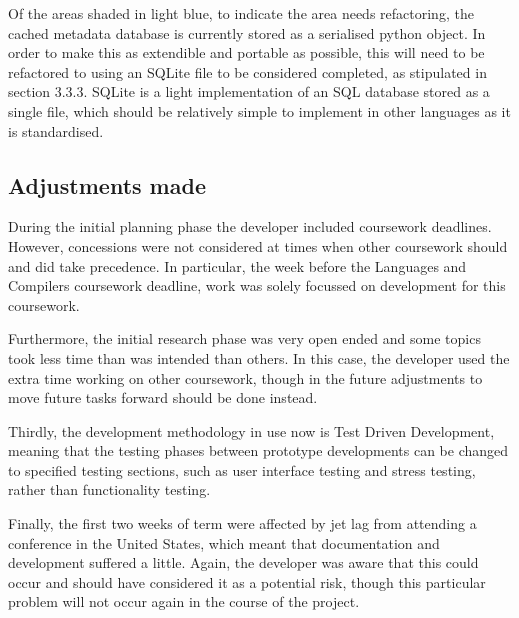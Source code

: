 Of the areas shaded in light blue, to indicate the area needs refactoring, the cached metadata database is currently stored as a serialised python object. In order to make this as extendible and portable as possible, this will need to be refactored to using an SQLite file to be considered completed, as stipulated in section 3.3.3. SQLite is a light implementation of an SQL database stored as a single file, which should be relatively simple to implement in other languages as it is standardised.
\subsection{Adjustments made}
During the initial planning phase the developer included coursework deadlines. However, concessions were not considered at times when other coursework should and did take precedence. In particular, the week before the Languages and Compilers coursework deadline, work was solely focussed on development for this coursework.

Furthermore, the initial research phase was very open ended and some topics took less time than was intended than others. In this case, the developer used the extra time working on other coursework, though in the future adjustments to move future tasks forward should be done instead.

Thirdly, the development methodology in use now is Test Driven Development, meaning that the testing phases between prototype developments can be changed to specified testing sections, such as user interface testing and stress testing, rather than functionality testing.

Finally, the first two weeks of term were affected by jet lag from attending a conference in the United States, which meant that documentation and development suffered a little. Again, the developer was aware that this could occur and should have considered it as a potential risk, though this particular problem will not occur again in the course of the project.

